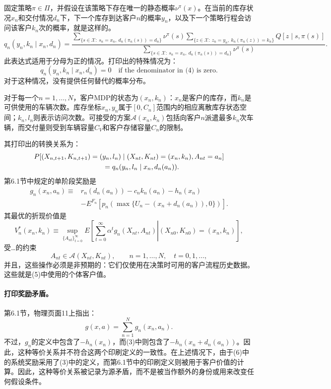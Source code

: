 \documentclass{article}
\begin{document}
固定策略$\pi\in\Pi$，并假设在该策略下存在唯一的静态概率$\nu^\pi(x)$。在当前的库存状况$x_n$和交付情况$d_n$下，下一个库存到达客户$n$的概率$y_n$，以及下一个策略行程会访问该客户$k_n$次的概率，就是这样的。
\begin{equation}
q_n(y_n,k_n\mid x_n,d_n)=
\frac{
\displaystyle\sum_{\{s\in\mathcal X:\ s_n=x_n,\ d_n(\pi_n(s))=d_n\}}
\nu^\pi(s)
\displaystyle\sum_{\{z\in\mathcal X:\ z_n=y_n,\ k_n(\pi_n(z))=k_n\}}
Q[z\mid s,\pi(s)]
}{
\displaystyle\sum_{\{s\in\mathcal X:\ s_n=x_n,\ d_n(\pi_n(s))=d_n\}}
\nu^\pi(s)
}.
\tag{4}
\end{equation}
此表达式适用于分母为正的情况。打印出的特殊情况为：
\[
q_n(y_n,k_n\mid x_n,d_n)=0
\quad\text{if the denominator in (4) is zero}.
\]
对于这种情况，没有提供任何替代的概率分布。

对于每一个$n=1,\ldots,N$，客户MDP的状态为$(x_n,k_n)$：$x_n$是客户的库存，而$k_n$是可供使用的车辆次数。库存坐标$x_n,y_n$属于$[0,C_n]$范围内的相应离散库存状态空间；$k_n,l_n$则表示访问次数。可接受的方案$\mathcal A(x_n,k_n)$包括向客户$n$派遣最多$k_n$次车辆，而交付量则受到车辆容量$C_V$和客户存储容量$C_n$的限制。

其打印出的转换关系为：
\[
\begin{aligned}
&P[(X_{n,t+1},K_{n,t+1})=(y_n,l_n)
\mid (X_{nt},K_{nt})=(x_n,k_n),A_{nt}=a_n]\\
&\hspace{35mm}=q_n(y_n,l_n\mid x_n,d_n(a_n)).
\end{aligned}
\]
第6.1节中规定的单阶段奖励是
\[
\begin{aligned}
g_n(x_n,a_n)\equiv{}&r_n(d_n(a_n))-c_nk_n(a_n)-h_n(x_n)\\
&-E^{F_n}\!\left[p_n\!\left(\max\{U_n-(x_n+d_n(a_n)),0\}\right)\right].
\end{aligned}
\]
其最优的折现价值是
\[
V_n^*(x_n,k_n)\equiv
\sup_{\{A_{nt}\}_{t=0}^{\infty}}
E\!\left[
\left.\sum_{t=0}^{\infty}\alpha^t g_n(X_{nt},A_{nt})
\right|(X_{n0},K_{n0})=(x_n,k_n)
\right],
\]
受…的约束
\[
A_{nt}\in\mathcal A(X_{nt},K_{nt}),
\qquad n=1,\ldots,N,\quad t=0,1,\ldots,
\]
并且，这些操作必须是非预期的：它们仅使用在决策时可用的客户流程历史数据。这些就是(5)中使用的个体客户值。

\paragraph{打印奖励矛盾。}
第6.1节，物理页面11上指出：
\[
g(x,a)=\sum_{n=1}^{N}g_n(x_n,a_n).
\]
不过，$g_n$的定义中包含了$-h_n(x_n)$，而(3)中则包含了$-h_n(x_n+d_n(a_n))$。因此，这种等价关系并不符合这两个印刷定义的一致性。在上述情况下，由于(6)中的系统奖励采用了(3)中的定义，而第6.1节中的印刷定义则被用于客户价值的计算。因此，这种等价关系被记录为源矛盾，而不是被当作额外的身份或用来改变任何假设条件。
\end{document}
